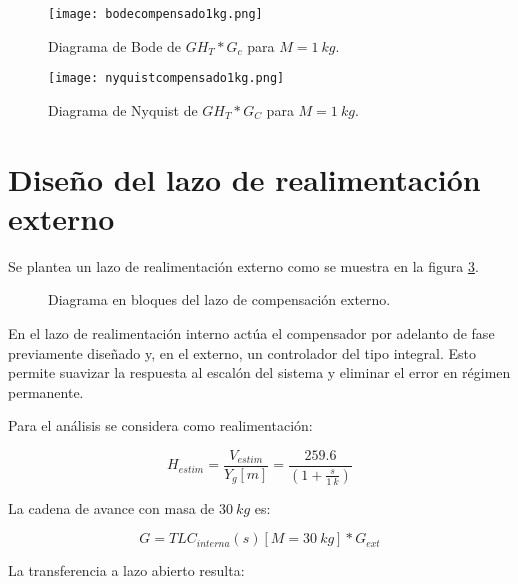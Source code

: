 \begin{figure}[H]
	\centering
	\texttt{[image: bodecompensado1kg.png]}
	\caption{Diagrama de Bode de $GH_T*G_c$ para $M=1\:kg$.}
	\label{fig:bode-analog-para-M-1Kg}
\end{figure}


\begin{figure}[H]
	\centering
	\texttt{[image: nyquistcompensado1kg.png]}
	\caption{Diagrama de Nyquist de $GH_T*G_C$ para $M=1\:kg$.}
	\label{fig:nyquist-analog-para-M-1Kg}
\end{figure}




\section{Diseño del lazo de realimentación externo}

\noindent Se plantea un lazo de realimentación externo como se muestra en la figura \ref{fig:diag-externo}. 

\begin{figure}[H]
	\centering
	
	\caption{Diagrama en bloques del lazo de compensación externo.}	\label{fig:diag-externo}
\end{figure}

En el lazo de realimentación interno actúa el compensador por adelanto de fase previamente diseñado y, en el externo, un controlador del tipo integral. Esto permite suavizar la respuesta al escalón del sistema y eliminar el error en régimen permanente.


\noindent Para el an\'{a}lisis se considera como realimentaci\'{o}n: 

\[H_{estim}=\frac{V_{estim}}{Y_g[m]}= \frac{259.6}{(1 + \frac{s}{1\:k})
}\] 

\noindent La cadena de avance con masa de $30\:kg$ es:

\begin{equation} \label{eq_cadena_avance_integrador}
	G=TLC_{interna}(s)[M=30\:kg]*G_{ext}
\end{equation}

La transferencia a lazo abierto resulta:

